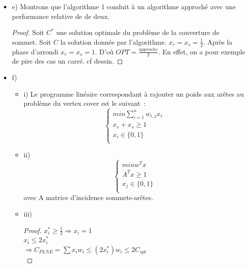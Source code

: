 \documentclass[a4paper, 12pt]{article}
\begin{document}
\begin{itemize}
\begin{itemize}
\begin{proof}
l'inégalité $x_r + x_s \geq 1$. Ainsi, on a $\neg (x_r + x_s < 1)$
d'où $\neg (x_r < \frac{1}{2} \wedge x_s < \frac{1}{2})$, et donc
($x_r \geq \frac{1}{2} \vee x_s \geq \frac{1}{2}) $ de par la loi de
De Morgan.
\end{proof}
\item Deuxième démonstration.
\begin{proof}
On sait que $A \Rightarrow B \equiv \neg A \vee B$. 
Or, pour respecter l'inégalité $x_r + x_s \geq 1$, on a $(x_r <
\frac{1}{2} \Rightarrow x_s \geq \frac{1}{2})$. On a ainsi $(x_r \geq
\frac{1}{2} \vee x_s \geq \frac{1}{2})$. 
\end{proof}
\end{itemize}
\item[] e) Montrons que l'algorithme 1 conduit à un algorithme
  approché avec une performance relative de de deux. 
\begin{proof}
Soit $C^{*}$ une solution optimale du problème de la couverture de
sommet. Soit $C$ la solution donnée par l'algorithme. 
$x_r=x_s=\frac{1}{2}$. Après la phase d'arrondi $x_r=x_s= 1$. D'où $
OPT = \frac{approche}{2}$.
En effet, on a pour exemple de pire des cas un carré. cf dessin.
\end{proof}
\item[] f)
\begin{itemize}
\item i)
Le programme linéaire correspondant à rajouter un poids aux arêtes au
problème du vertex cover est le suivant~:
\begin{equation}
\begin{cases}
min \sum_{i=1}^n w_{i, j}x_i \\
x_r + x_s \geq 1 \\
x_i \in \{ 0, 1 \} \\
\end{cases}
\end{equation}
\item ii)
\begin{equation}
\begin{cases}
min w^Tx \\
A^Tx \geq 1 \\
x_j \in \{0, 1\} \\
\end{cases}
\end{equation}
avec A matrice d'incidence sommets-arêtes.
\item iii) \begin{proof}
$x_i^*\geq \frac{1}{2} \Rightarrow x_i = 1$ \\
$x_i \leq 2x_i^*$ \\
$\Rightarrow C_{PLNE}=\sum x_iw_i \leq (2x_i^*)w_i \leq 2C_{opt}$ \\
\end{proof}
\end{itemize}
\end{itemize}
\end{document}
